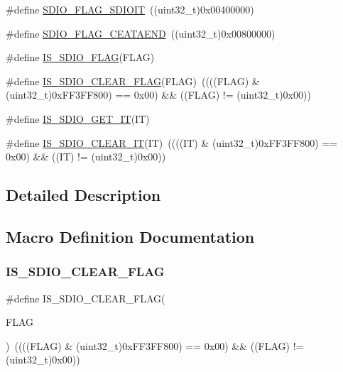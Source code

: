 \begin{DoxyCompactItemize}
\#define \mbox{\hyperlink{group___s_d_i_o___flags_gae888ec1c9885c35a5f8e01bcffe324a1}{S\+D\+I\+O\+\_\+\+F\+L\+A\+G\+\_\+\+S\+D\+I\+O\+IT}}~((uint32\+\_\+t)0x00400000)
\item 
\#define \mbox{\hyperlink{group___s_d_i_o___flags_ga3c8d09a405944948e7a1c5493d49aff1}{S\+D\+I\+O\+\_\+\+F\+L\+A\+G\+\_\+\+C\+E\+A\+T\+A\+E\+ND}}~((uint32\+\_\+t)0x00800000)
\item 
\#define \mbox{\hyperlink{group___s_d_i_o___flags_ga04b3c3c316e112172abacbf5e316f24a}{I\+S\+\_\+\+S\+D\+I\+O\+\_\+\+F\+L\+AG}}(F\+L\+AG)
\item 
\#define \mbox{\hyperlink{group___s_d_i_o___flags_ga8a093bc0b51901676fd5da7087d8ab3a}{I\+S\+\_\+\+S\+D\+I\+O\+\_\+\+C\+L\+E\+A\+R\+\_\+\+F\+L\+AG}}(F\+L\+AG)~((((F\+L\+AG) \& (uint32\+\_\+t)0x\+F\+F3\+F\+F800) == 0x00) \&\& ((\+F\+L\+A\+G) != (uint32\+\_\+t)0x00))
\item 
\#define \mbox{\hyperlink{group___s_d_i_o___flags_gaef42c81f1f6250d8f9f438f4e16d1e98}{I\+S\+\_\+\+S\+D\+I\+O\+\_\+\+G\+E\+T\+\_\+\+IT}}(IT)
\item 
\#define \mbox{\hyperlink{group___s_d_i_o___flags_gaf829b01d8c3e9a1e4e04d39abdc8c355}{I\+S\+\_\+\+S\+D\+I\+O\+\_\+\+C\+L\+E\+A\+R\+\_\+\+IT}}(IT)~((((IT) \& (uint32\+\_\+t)0x\+F\+F3\+F\+F800) == 0x00) \&\& ((\+I\+T) != (uint32\+\_\+t)0x00))
\end{DoxyCompactItemize}


\subsection{Detailed Description}


\subsection{Macro Definition Documentation}
\mbox{\label{group___s_d_i_o___flags_ga8a093bc0b51901676fd5da7087d8ab3a}} 
\subsubsection{\texorpdfstring{IS\_SDIO\_CLEAR\_FLAG}{IS\_SDIO\_CLEAR\_FLAG}}
{\footnotesize\ttfamily \#define I\+S\+\_\+\+S\+D\+I\+O\+\_\+\+C\+L\+E\+A\+R\+\_\+\+F\+L\+AG(\begin{DoxyParamCaption}\item[{}]{F\+L\+AG }\end{DoxyParamCaption})~((((F\+L\+AG) \& (uint32\+\_\+t)0x\+F\+F3\+F\+F800) == 0x00) \&\& ((\+F\+L\+A\+G) != (uint32\+\_\+t)0x00))}

